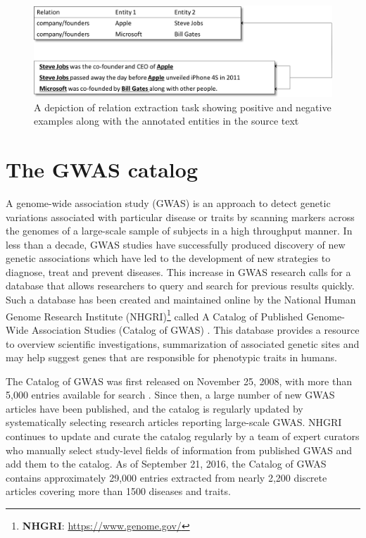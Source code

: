 \begin{figure}[ht]
    \centering
    \includegraphics[width=0.85\linewidth]{Images/Relation-Example.png}
    \caption{A depiction of relation extraction task showing positive and negative examples along with the annotated entities in the source text}
    \label{figure:relation-extraction-example}
\end{figure}
    
\section{The GWAS catalog}
\label{section:gwas-catalog}
A genome-wide association study (GWAS) is an approach to detect genetic variations associated with particular disease or traits by scanning markers across the genomes of a large-scale sample of subjects in a high throughput manner. In less than a decade, GWAS studies have successfully produced discovery of new genetic associations which have led to the development of new strategies to diagnose, treat and prevent diseases. This increase in GWAS research calls for a database that allows researchers to query and search for previous results quickly. Such a database has been created and maintained online by the National Human Genome Research Institute (NHGRI)\footnote{\textbf{NHGRI}: \url{https://www.genome.gov/}} called A Catalog of Published Genome-Wide Association Studies (Catalog of GWAS) \cite{hindorff2011catalog}. This database provides a resource to overview scientific investigations, summarization of associated genetic sites and may help suggest genes that are responsible for phenotypic traits in humans. 

The Catalog of GWAS was first released on November 25, 2008, with more than 5,000 entries available for search \cite{welter2014nhgri}. Since then, a large number of new GWAS articles have been published, and the catalog is regularly updated by systematically selecting research articles reporting large-scale GWAS. NHGRI continues to update and curate the catalog regularly by a team of expert curators who manually select study-level fields of information from published GWAS and add them to the catalog. As of September 21, 2016, the Catalog of GWAS contains approximately 29,000 entries extracted from nearly 2,200 discrete articles covering more than 1500 diseases and traits. 

